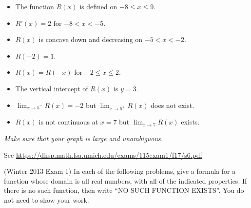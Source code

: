 \documentclass[11pt]{exam}
\begin{document}
\begin{questions}
\begin{itemize}
\item The function $R(x)$ is defined on $-8 \leqslant x \leqslant 9$.
\item $R'(x) = 2$ for $-8 < x < -5$.
\item $R(x)$ is concave down and decreasing on $-5<x<-2$.
\item $R(-2) = 1$.
\item $R(x) = R(-x)$ for $-2 \leqslant x \leqslant 2$.
\item The vertical intercept of $R(x)$ is $y=3$.
\item $\displaystyle\lim_{x \rightarrow 5^-}  R(x) = -2$ but $\displaystyle\lim_{x \rightarrow 5^+} R(x)$ does not exist.
\item $R(x)$ is not continuous at $x=7$ but $\displaystyle\lim_{x \rightarrow 7} R(x)$ exists.
\end{itemize}
\emph{Make sure that your graph is large and unambiguous.}
\begin{solution}
  See \href{https://dhsp.math.lsa.umich.edu/exams/115exam1/f17/s6.pdf}{https://dhsp.math.lsa.umich.edu/exams/115exam1/f17/s6.pdf}
\end{solution}
\question (Winter 2013 Exam 1) In each of the following problems, give a formula for a function whose domain is all real numbers, with all of the indicated properties. If there is no such function, then write “NO SUCH FUNCTION EXISTS”. You do not need to show your work.


\end{questions}
\end{document}

